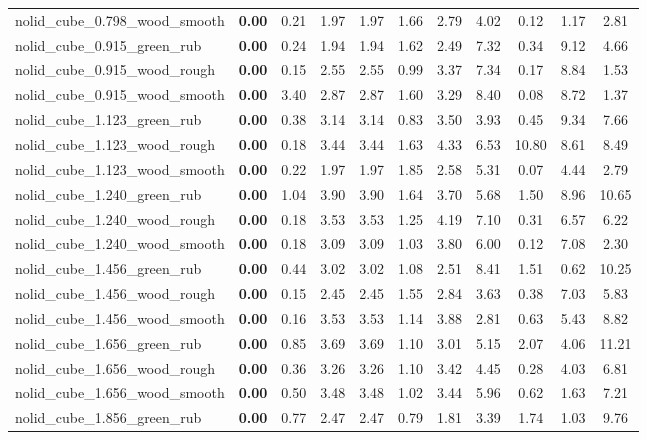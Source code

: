 \begin{table}[H]
{\begin{tabular}{l cccccccccc}
        nolid\_cube\_0.798\_wood\_smooth & \textbf{0.00} & 0.21 & 1.97 & 1.97 & 1.66 & 2.79 & 4.02 & 0.12 & 1.17 & 2.81 \\
        nolid\_cube\_0.915\_green\_rub & \textbf{0.00} & 0.24 & 1.94 & 1.94 & 1.62 & 2.49 & 7.32 & 0.34 & 9.12 & 4.66 \\
        nolid\_cube\_0.915\_wood\_rough & \textbf{0.00} & 0.15 & 2.55 & 2.55 & 0.99 & 3.37 & 7.34 & 0.17 & 8.84 & 1.53 \\
        nolid\_cube\_0.915\_wood\_smooth & \textbf{0.00} & 3.40 & 2.87 & 2.87 & 1.60 & 3.29 & 8.40 & 0.08 & 8.72 & 1.37 \\
        nolid\_cube\_1.123\_green\_rub & \textbf{0.00} & 0.38 & 3.14 & 3.14 & 0.83 & 3.50 & 3.93 & 0.45 & 9.34 & 7.66 \\
        nolid\_cube\_1.123\_wood\_rough & \textbf{0.00} & 0.18 & 3.44 & 3.44 & 1.63 & 4.33 & 6.53 & 10.80 & 8.61 & 8.49 \\
        nolid\_cube\_1.123\_wood\_smooth & \textbf{0.00} & 0.22 & 1.97 & 1.97 & 1.85 & 2.58 & 5.31 & 0.07 & 4.44 & 2.79 \\
        nolid\_cube\_1.240\_green\_rub & \textbf{0.00} & 1.04 & 3.90 & 3.90 & 1.64 & 3.70 & 5.68 & 1.50 & 8.96 & 10.65 \\
        nolid\_cube\_1.240\_wood\_rough & \textbf{0.00} & 0.18 & 3.53 & 3.53 & 1.25 & 4.19 & 7.10 & 0.31 & 6.57 & 6.22 \\
        nolid\_cube\_1.240\_wood\_smooth & \textbf{0.00} & 0.18 & 3.09 & 3.09 & 1.03 & 3.80 & 6.00 & 0.12 & 7.08 & 2.30 \\
        nolid\_cube\_1.456\_green\_rub & \textbf{0.00} & 0.44 & 3.02 & 3.02 & 1.08 & 2.51 & 8.41 & 1.51 & 0.62 & 10.25 \\
        nolid\_cube\_1.456\_wood\_rough & \textbf{0.00} & 0.15 & 2.45 & 2.45 & 1.55 & 2.84 & 3.63 & 0.38 & 7.03 & 5.83 \\
        nolid\_cube\_1.456\_wood\_smooth & \textbf{0.00} & 0.16 & 3.53 & 3.53 & 1.14 & 3.88 & 2.81 & 0.63 & 5.43 & 8.82 \\
        nolid\_cube\_1.656\_green\_rub & \textbf{0.00} & 0.85 & 3.69 & 3.69 & 1.10 & 3.01 & 5.15 & 2.07 & 4.06 & 11.21 \\
        nolid\_cube\_1.656\_wood\_rough & \textbf{0.00} & 0.36 & 3.26 & 3.26 & 1.10 & 3.42 & 4.45 & 0.28 & 4.03 & 6.81 \\
        nolid\_cube\_1.656\_wood\_smooth & \textbf{0.00} & 0.50 & 3.48 & 3.48 & 1.02 & 3.44 & 5.96 & 0.62 & 1.63 & 7.21 \\
        nolid\_cube\_1.856\_green\_rub & \textbf{0.00} & 0.77 & 2.47 & 2.47 & 0.79 & 1.81 & 3.39 & 1.74 & 1.03 & 9.76 \\

\end{tabular}}
\end{table}

